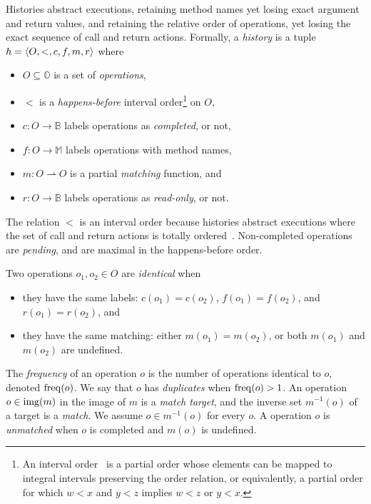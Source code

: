 Histories abstract executions, retaining method
names yet losing exact argument and return values, and retaining the relative
order of operations, yet losing the exact sequence of call and return actions.
Formally, a \emph{history} is a tuple $h = {\left\langle{O,<,c,f,m,r}\right\rangle}$ where
\begin{itemize}

  \item $O \subseteq \mathbb{O}$ is a set of \emph{operations},

  \item $<$ is a \emph{happens-before} interval order\footnote{An interval
  order~\cite{books/Fishburn85} is a partial order whose elements can be mapped
  to integral intervals preserving the order relation, or equivalently, a
  partial order for which $w < x$ and $y < z$ implies $w < z$ or $y < x$.} on
  $O$,

  \item $c: O \to \mathbb{B}$ labels operations as \emph{completed}, or not,

  \item $f: O \to \mathbb{M}$ labels operations with method names,

  \item $m: O \rightharpoonup O$ is a partial \emph{matching} function, and

  \item $r: O \to \mathbb{B}$ labels operations as \emph{read-only}, or not.

\end{itemize}
The relation $<$ is an interval order because histories abstract executions where
the set of call and return actions is totally ordered~\cite{conf/popl/BouajjaniEEH15}.
Non-completed operations are \emph{pending}, and are maximal in the
happens-before order.

Two operations $o_1, o_2 \in O$ are \emph{identical} when
\begin{itemize}

  \item they have the same labels: $c(o_1) = c(o_2)$, $f(o_1)= f(o_2)$, and
  $r(o_1) = r(o_2)$, and

  \item they have the same matching: either $m(o_1) = m(o_2)$, or both $m(o_1)$
  and $m(o_2)$ are undefined.

\end{itemize}
The \emph{frequency} of an operation $o$ is the number of operations identical
to $o$, denoted $\operatorname{freq}(o)$. We say that $o$ has \emph{duplicates} when
$\operatorname{freq}(o) > 1$. An operation $o \in \operatorname{img}(m)$ in the image of $m$ is a
\emph{match target}, and the inverse set $m^{-1}(o)$ of a target is a
\emph{match}. We assume $o \in m^{-1}(o)$ for every $o$. A operation $o$ is \emph{unmatched}
when $o$ is completed and $m(o)$ is undefined.

